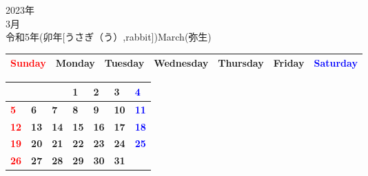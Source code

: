 \documentclass[a4paper,landscape]{jsarticle}
\newcommand{\dig}{\hspace{29mm}}
\newcommand{\tdig}{\hspace{27mm}}
\newcommand{\LBF}{\LARGE\textbf}
\begin{document}
\begin{center}
	\HUGE 2023年\\
	\huge 3月\\
	\large 令和5年(卯年[うさぎ（う）,rabbit])March(弥生)
\end{center}

\begingroup
\renewcommand{\arraystretch}{1.4}
\begin{tabular}{|>{\centering\arraybackslash}p{32mm}|>{\centering\arraybackslash}p{32mm}|>{\centering\arraybackslash}p{32mm}|>{\centering\arraybackslash}p{32mm}|>{\centering\arraybackslash}p{32mm}|>{\centering\arraybackslash}p{32mm}|>{\centering\arraybackslash}p{32mm}|}
\hline
\textcolor{red}{\large Sunday}&\large Monday&\large Tuesday&\large Wednesday&\large Thursday&\large Friday&\textcolor{blue}{\large Saturday}\\
\hline
\end{tabular}
\endgroup

\begingroup
\renewcommand{\arraystretch}{4}
\begin{tabular}{|p{32mm}|p{32mm}|p{32mm}|p{32mm}|p{32mm}|p{32mm}|p{32mm}|}
\hline
&&&\raisebox{30pt} {\dig\LBF{1}}&\raisebox{30pt} {\dig\LBF{2}}&\raisebox{30pt} {\dig\LBF{3}}&\raisebox{30pt} {\dig\textcolor{blue}{\LBF{4}}}\\
\hline
\raisebox{30pt} {\dig\textcolor{red}{\LBF{5}}}&\raisebox{30pt} {\dig\LBF{6}}&\raisebox{30pt} {\dig\LBF{7}}&\raisebox{30pt} {\dig\LBF{8}}&\raisebox{30pt} {\dig\LBF{9}}&\raisebox{30pt} {\tdig\LBF{10}}&\raisebox{30pt} {\tdig\textcolor{blue}{\LBF{11}}}\\
\hline
\raisebox{30pt} {\tdig\textcolor{red}{\LBF{12}}}&\raisebox{30pt} {\tdig\LBF{13}}&\raisebox{30pt} {\tdig\LBF{14}}&\raisebox{30pt} {\tdig\LBF{15}}&\raisebox{30pt} {\tdig\LBF{16}}&\raisebox{30pt} {\tdig\LBF{17}}&\raisebox{30pt} {\tdig\textcolor{blue}{\LBF{18}}}\\
\hline
\raisebox{30pt} {\tdig\textcolor{red}{\LBF{19}}}&\raisebox{30pt} {\tdig\LBF{20}}&\raisebox{30pt} {\tdig\LBF{21}}&\raisebox{30pt} {\tdig\LBF{22}}&\raisebox{30pt} {\tdig\LBF{23}}&\raisebox{30pt} {\tdig\LBF{24}}&\raisebox{30pt} {\tdig\textcolor{blue}{\LBF{25}}}\\
\hline
\raisebox{30pt} {\tdig\textcolor{red}{\LBF{26}}}&\raisebox{30pt} {\tdig\LBF{27}}&\raisebox{30pt} {\tdig\LBF{28}}&\raisebox{30pt} {\tdig\LBF{29}}&\raisebox{30pt} {\tdig\LBF{30}}&\raisebox{30pt} {\tdig\LBF{31}}&\\
\hline
\end{tabular}
\endgroup
\end{document}
